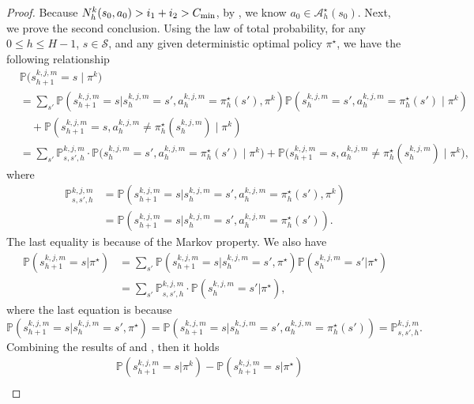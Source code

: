 \documentclass{article}
\begin{document}
\begin{proof}
Because $N_h^k(s_0,a_0) > i_1 + i_2 > C_{\textnormal{min}}$, by , we know $a_0 \in \mathcal{A}_h^{\star}(s_0)$. Next, we prove the second conclusion. Using the law of total probability, for any $0 \leq h \leq H-1$, $s \in \mathcal{S}$, and any given deterministic optimal policy $\pi^{\star}$, we have the following relationship
\begin{align}
    \label{prob1}
    &\mathbb{P}\big(s_{h+1}^{k,j,m} = s \mid \pi^k \big) \nonumber\\
&= \sum_{s'} \mathbb{P}\left(s_{h+1}^{k,j,m} = s|s_h^{k,j,m} = s', a_h^{k,j,m} = \pi_h^{\star}(s'), \pi^k\right)\mathbb{P}\left(s_h^{k,j,m} = s', a_h^{k,j,m} = \pi_h^{\star}(s') \mid \pi^k\right) \nonumber\\
&\quad 
+\mathbb{P}\left(s_{h+1}^{k,j,m} = s, a_h^{k,j,m} \neq \pi_h^{\star}(s_{h}^{k,j,m}) \mid \pi^k \right) \nonumber\\
& = \sum_{s'}\mathbb{P}_{s,s',h}^{k,j,m} \cdot \mathbb{P}\Big(s_h^{k,j,m} = s', a_h^{k,j,m} = \pi_h^{\star}(s') \mid \pi^k\Big) 
+\mathbb{P}\Big(s_{h+1}^{k,j,m} = s, a_h^{k,j,m} \neq \pi_h^{\star}(s_{h}^{k,j,m}) \mid \pi^k\Big),
\end{align}
where
\begin{align*}
    \mathbb{P}_{s,s',h}^{k,j,m} &= \mathbb{P}\left(s_{h+1}^{k,j,m} = s|s_h^{k,j,m} = s', a_h^{k,j,m} = \pi_h^{\star}(s'), \pi^k\right) \\
    &= \mathbb{P}\left(s_{h+1}^{k,j,m} = s|s_h^{k,j,m} = s', a_h^{k,j,m} =  \pi_h^{\star}(s')\right).
\end{align*}
The last equality is because of the Markov property. We also have
\begin{align}
    \label{prob2}
    \mathbb{P}\left(s_{h+1}^{k,j,m} = s|\pi^{\star}\right) & =\sum_{s'} \mathbb{P}\left(s_{h+1}^{k,j,m} = s|s_h^{k,j,m} = s', \pi^{\star}\right)\mathbb{P}\left(s_h^{k,j,m} = s'|\pi^{\star}\right) \nonumber\\
    &= \sum_{s'} \mathbb{P}_{s,s',h}^{k,j,m} \cdot \mathbb{P}\left(s_h^{k,j,m} = s'|\pi^{\star}\right),
\end{align}
where the last equation is because $$\mathbb{P}(s_{h+1}^{k,j,m} = s|s_h^{k,j,m} = s', \pi^{\star}) = \mathbb{P}\left(s_{h+1}^{k,j,m} = s|s_h^{k,j,m} = s', a_h^{k,j,m} =  \pi_h^{\star}(s')\right) = \mathbb{P}_{s,s',h}^{k,j,m}.$$
Combining the results of  and , then it holds
\begin{align*}
    &\mathbb{P}\left(s_{h+1}^{k,j,m} = s | \pi^k\right) - \mathbb{P}\left(s_{h+1}^{k,j,m} = s|\pi^{\star}\right) \nonumber\\

\end{align*}
\end{proof}
\end{document}
